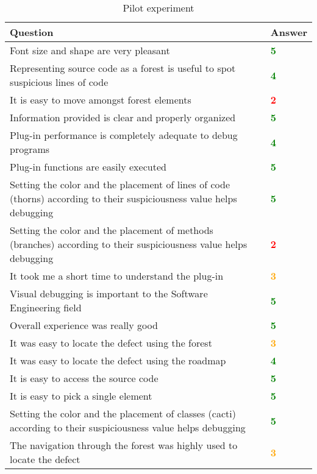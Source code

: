 \begin{table}
\caption{Pilot experiment}
\begin{tabular}{m{11cm} | l}
    \textbf{Question} & \textbf{Answer}\\
    \hline
    Font size and shape are very pleasant &\textbf{\textcolor{green}{5}} \\ \hline
    Representing source code as a forest is useful to spot suspicious lines of code &\textbf{\textcolor{green}{4}} \\ \hline
    It is easy to move amongst forest elements &\textbf{\textcolor{red}{2}} \\ \hline
    Information provided is clear and properly organized &\textbf{\textcolor{green}{5}} \\ \hline
    Plug-in performance is completely adequate to debug programs &\textbf{\textcolor{green}{4}} \\ \hline
    Plug-in functions are easily executed &\textbf{\textcolor{green}{5}} \\ \hline
    Setting the color and the placement of lines of code (thorns) according to their suspiciousness value helps debugging &\textbf{\textcolor{green}{5}} \\ \hline
    Setting the color and the placement of methods (branches) according to their suspiciousness value helps debugging &\textbf{\textcolor{red}{2}} \\ \hline
    It took me a short time to understand the plug-in &\textbf{\textcolor{orange}{3}} \\ \hline
    Visual debugging is important to the Software Engineering field &\textbf{\textcolor{green}{5}} \\ \hline
    Overall experience was really good &\textbf{\textcolor{green}{5}} \\ \hline
    It was easy to locate the defect using the forest &\textbf{\textcolor{orange}{3}} \\ \hline
    It was easy to locate the defect using the roadmap
    &\textbf{\textcolor{green}{4}} \\ \hline It is easy to access the source code &\textbf{\textcolor{green}{5}} \\ \hline It is easy to pick a single element &\textbf{\textcolor{green}{5}} \\ \hline
    Setting the color and the placement of classes (cacti) according to their
    suspiciousness value helps debugging &\textbf{\textcolor{green}{5}} \\ \hline The navigation through the forest was highly used to locate the defect &\textbf{\textcolor{orange}{3}} \\ \hline

\end{tabular}
\end{table}
